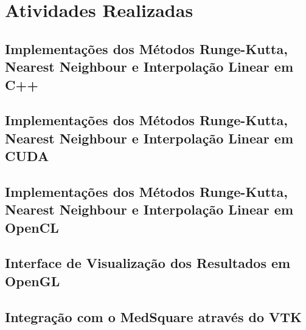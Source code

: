 \chapter{Atividades Realizadas}

\section{Implementações dos Métodos Runge-Kutta, Nearest Neighbour e Interpolação Linear em C++}
\section{Implementações dos Métodos Runge-Kutta, Nearest Neighbour e Interpolação Linear em CUDA}
\section{Implementações dos Métodos Runge-Kutta, Nearest Neighbour e Interpolação Linear em OpenCL}
\section{Interface de Visualização dos Resultados em OpenGL}
\section{Integração com o MedSquare através do VTK}
